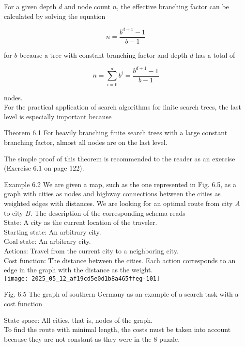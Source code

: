 \documentclass[10pt]{article}
\begin{document}
For a given depth $d$ and node count $n$, the effective branching factor can be calculated by solving the equation


\begin{equation*}
n=\frac{b^{d+1}-1}{b-1} \tag{6.1}
\end{equation*}


for $b$ because a tree with constant branching factor and depth $d$ has a total of


\begin{equation*}
n=\sum_{i=0}^{d} b^{i}=\frac{b^{d+1}-1}{b-1} \tag{6.2}
\end{equation*}


nodes.\\
For the practical application of search algorithms for finite search trees, the last level is especially important because

Theorem 6.1 For heavily branching finite search trees with a large constant branching factor, almost all nodes are on the last level.

The simple proof of this theorem is recommended to the reader as an exercise (Exercise 6.1 on page 122).

Example 6.2 We are given a map, such as the one represented in Fig. 6.5, as a graph with cities as nodes and highway connections between the cities as weighted edges with distances. We are looking for an optimal route from city $A$ to city $B$. The description of the corresponding schema reads\\
State: A city as the current location of the traveler.\\
Starting state: An arbitrary city.\\
Goal state: An arbitrary city.\\
Actions: Travel from the current city to a neighboring city.\\
Cost function: The distance between the cities. Each action corresponds to an edge in the graph with the distance as the weight.\\
\texttt{[image: 2025\_05\_12\_af19cd5e0d1b8a465ffeg-101]}

Fig. 6.5 The graph of southern Germany as an example of a search task with a cost function

State space: All cities, that is, nodes of the graph.\\
To find the route with minimal length, the costs must be taken into account because they are not constant as they were in the 8-puzzle.
\end{document}
